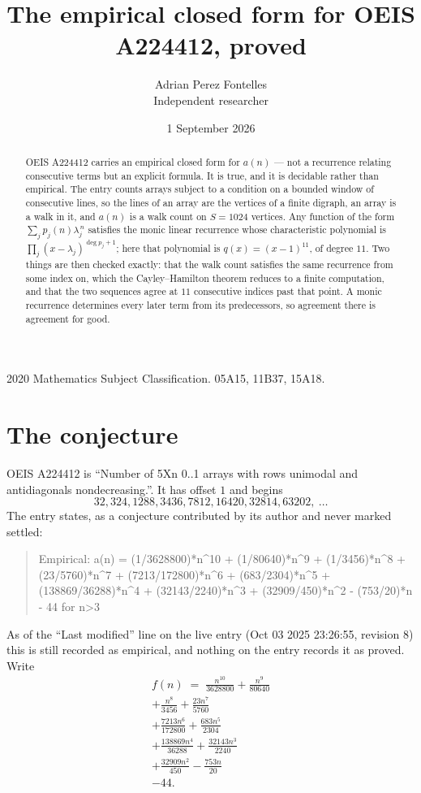 \documentclass[11pt,a4paper]{article}
\title{The empirical closed form for OEIS A224412, proved}
\author{Adrian Perez Fontelles\\ \small Independent researcher}
\date{1 September 2026}
\theoremstyle{plain}
\theoremstyle{definition}
\begin{document}
\maketitle

\begin{abstract}
OEIS A224412 carries an empirical closed form for $a(n)$ --- not a recurrence relating
consecutive terms but an explicit formula. It is true, and it is decidable rather than
empirical. The entry counts arrays subject to a condition on a bounded window of consecutive lines, so the lines of an array are the
vertices of a finite digraph, an array is a walk in it, and $a(n)$ is a walk count on
$S=1024$ vertices. Any function of the form $\sum_j p_j(n)\lambda_j^{\,n}$ satisfies the
monic linear recurrence whose characteristic polynomial is
$\prod_j(x-\lambda_j)^{\deg p_j+1}$; here that polynomial is $q(x)=(x-1)^{11}$, of degree
$11$. Two things are then checked exactly: that the walk count satisfies the same
recurrence from some index on, which the Cayley--Hamilton theorem reduces to a finite
computation, and that the two sequences agree at $11$ consecutive indices past that
point. A monic recurrence determines every later term from its predecessors, so agreement
there is agreement for good.
\end{abstract}

\noindent\small 2020 Mathematics Subject Classification. 05A15, 11B37, 15A18.\normalsize

\section{The conjecture}

OEIS A224412 is ``Number of 5Xn 0..1 arrays with rows unimodal and antidiagonals nondecreasing.''. It has offset $1$ and begins
\[
32, 324, 1288, 3436, 7812, 16420, 32814, 63202,\ \dots
\]
The entry states, as a conjecture contributed by its author and never marked settled:
\begin{quote}
Empirical: a(n) = (1/3628800)*n\^{}10 + (1/80640)*n\^{}9 + (1/3456)*n\^{}8 + (23/5760)*n\^{}7 + (7213/172800)*n\^{}6 + (683/2304)*n\^{}5 + (138869/36288)*n\^{}4 + (32143/2240)*n\^{}3 + (32909/450)*n\^{}2 - (753/20)*n - 44 for n>3
\end{quote}
As of the ``Last modified'' line on the live entry (Oct 03 2025 23:26:55, revision 8) this is still
recorded as empirical, and nothing on the entry records it as proved. Write
\begin{multline*}
f(n)\;=\;\frac{n^{10}}{3628800} + \frac{n^{9}}{80640} \\
+ \frac{n^{8}}{3456} + \frac{23 n^{7}}{5760} \\
+ \frac{7213 n^{6}}{172800} + \frac{683 n^{5}}{2304} \\
+ \frac{138869 n^{4}}{36288} + \frac{32143 n^{3}}{2240} \\
+ \frac{32909 n^{2}}{450} - \frac{753 n}{20} \\
- 44.
\end{multline*}
\end{document}
